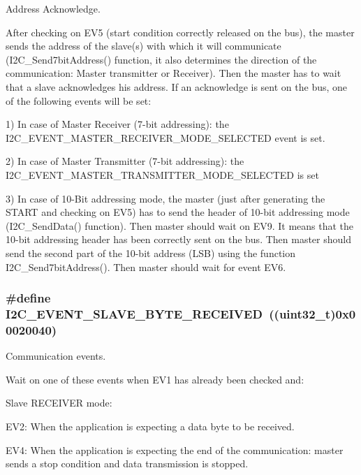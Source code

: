 Address Acknowledge. 

After checking on EV5 (start condition correctly released on the bus), the master sends the address of the slave(s) with which it will communicate (I2C\_\-Send7bitAddress() function, it also determines the direction of the communication: Master transmitter or Receiver). Then the master has to wait that a slave acknowledges his address. If an acknowledge is sent on the bus, one of the following events will be set:

1) In case of Master Receiver (7-\/bit addressing): the I2C\_\-EVENT\_\-MASTER\_\-RECEIVER\_\-MODE\_\-SELECTED event is set.

2) In case of Master Transmitter (7-\/bit addressing): the I2C\_\-EVENT\_\-MASTER\_\-TRANSMITTER\_\-MODE\_\-SELECTED is set

3) In case of 10-\/Bit addressing mode, the master (just after generating the START and checking on EV5) has to send the header of 10-\/bit addressing mode (I2C\_\-SendData() function). Then master should wait on EV9. It means that the 10-\/bit addressing header has been correctly sent on the bus. Then master should send the second part of the 10-\/bit address (LSB) using the function I2C\_\-Send7bitAddress(). Then master should wait for event EV6. \hypertarget{group__I2C__Events_ga8b244626839940569c6c8bbfc4efe21d}{
\subsubsection[{I2C\_\-EVENT\_\-SLAVE\_\-BYTE\_\-RECEIVED}]{\setlength{\rightskip}{0pt plus 5cm}\#define I2C\_\-EVENT\_\-SLAVE\_\-BYTE\_\-RECEIVED~((uint32\_\-t)0x00020040)}}
\label{group__I2C__Events_ga8b244626839940569c6c8bbfc4efe21d}


Communication events. 

Wait on one of these events when EV1 has already been checked and:


\begin{DoxyItemize}
\item Slave RECEIVER mode:
\begin{DoxyItemize}
\item EV2: When the application is expecting a data byte to be received.
\item EV4: When the application is expecting the end of the communication: master sends a stop condition and data transmission is stopped.
\end{DoxyItemize}
\end{DoxyItemize}


